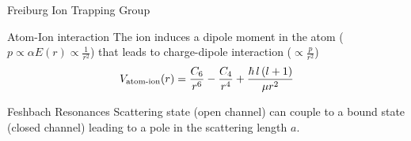 \begin{frame}[t]{Freiburg Ion Trapping Group}
\end{frame}

\begin{frame}[t]{Atom-Ion interaction}
    The ion induces a dipole moment in the atom ($p \propto \alpha E(r) \propto \frac{1}{r^2}$) that leads to
    charge-dipole interaction ($\propto\frac{p}{r^2}$)
   \[ 
        \setlength{\abovedisplayskip}{2pt}
        \setlength{\belowdisplayskip}{2pt}
       V_\text{atom-ion}(r) = \frac{C_6}{r^6} - \frac{C_4}{r^4} + \frac{\hbar \,l\,(l+1)}{\mu r^2}
       \]
\end{frame}

\begin{frame}[t]{Feshbach Resonances}
    Scattering state (open channel) can couple to a bound state (closed channel) leading to a pole in the
    scattering length $a$.
\end{frame}

